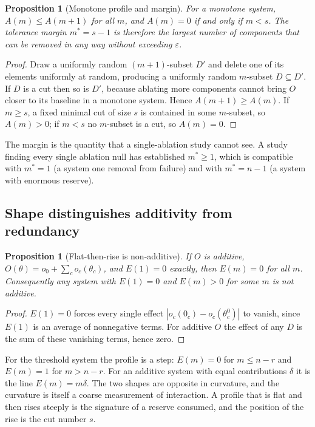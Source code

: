 \documentclass[11pt]{article}
\newtheorem{proposition}[theorem]{Proposition}
\theoremstyle{definition}
\theoremstyle{remark}
\begin{document}
\begin{proposition}[Monotone profile and margin]\label{prop:margin}
For a monotone system, $A(m)\le A(m+1)$ for all $m$, and $A(m)=0$ if and only if $m<s$. The \emph{tolerance margin} $m^*=s-1$ is therefore the largest number of components that can be removed in any way without exceeding $\varepsilon$.
\end{proposition}
\begin{proof}
Draw a uniformly random $(m+1)$-subset $D'$ and delete one of its elements uniformly at random, producing a uniformly random $m$-subset $D\subseteq D'$. If $D$ is a cut then so is $D'$, because ablating more components cannot bring $O$ closer to its baseline in a monotone system. Hence $A(m+1)\ge A(m)$. If $m\ge s$, a fixed minimal cut of size $s$ is contained in some $m$-subset, so $A(m)>0$; if $m<s$ no $m$-subset is a cut, so $A(m)=0$.
\end{proof}

The margin is the quantity that a single-ablation study cannot see. A study finding every single ablation null has established $m^*\ge1$, which is compatible with $m^*=1$ (a system one removal from failure) and with $m^*=n-1$ (a system with enormous reserve).

\subsection{Shape distinguishes additivity from redundancy}

\begin{proposition}[Flat-then-rise is non-additive]\label{prop:flat}
If $O$ is additive, $O(\theta)=o_0+\sum_c o_c(\theta_c)$, and $E(1)=0$ exactly, then $E(m)=0$ for all $m$. Consequently any system with $E(1)=0$ and $E(m)>0$ for some $m$ is not additive.
\end{proposition}
\begin{proof}
$E(1)=0$ forces every single effect $|o_c(0_c)-o_c(\theta^0_c)|$ to vanish, since $E(1)$ is an average of nonnegative terms. For additive $O$ the effect of any $D$ is the sum of these vanishing terms, hence zero.
\end{proof}

For the threshold system the profile is a step: $E(m)=0$ for $m\le n-r$ and $E(m)=1$ for $m>n-r$. For an additive system with equal contributions $\delta$ it is the line $E(m)=m\delta$. The two shapes are opposite in curvature, and the curvature is itself a coarse measurement of interaction. A profile that is flat and then rises steeply is the signature of a reserve consumed, and the position of the rise is the cut number $s$.
\end{document}
